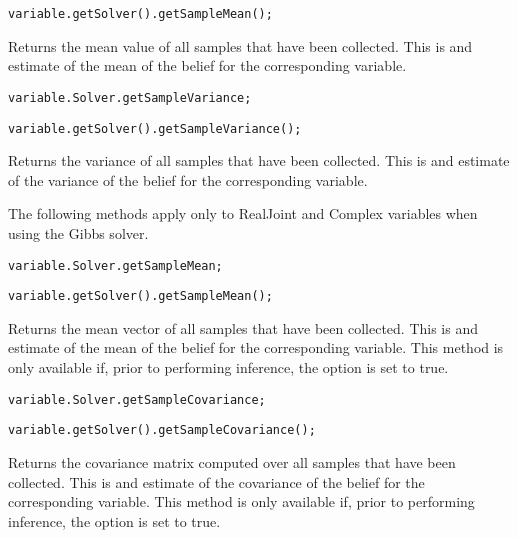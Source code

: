\ifjava
\begin{lstlisting}
variable.getSolver().getSampleMean();
\end{lstlisting}
\fi

Returns the mean value of all samples that have been collected.  This is and estimate of the mean of the belief for the corresponding variable.

\ifmatlab
\begin{lstlisting}
variable.Solver.getSampleVariance;
\end{lstlisting}
\fi

\ifjava
\begin{lstlisting}
variable.getSolver().getSampleVariance();
\end{lstlisting}
\fi

Returns the variance of all samples that have been collected.  This is and estimate of the variance of the belief for the corresponding variable.

\label{sec:RealJointVariableSpecificMethods}

The following methods apply only to RealJoint and Complex variables when using the Gibbs solver.

\ifmatlab
\begin{lstlisting}
variable.Solver.getSampleMean;
\end{lstlisting}
\fi

\ifjava
\begin{lstlisting}
variable.getSolver().getSampleMean();
\end{lstlisting}
\fi

Returns the mean vector of all samples that have been collected.  This is and estimate of the mean of the belief for the corresponding variable.  This method is only available if, prior to performing inference, the option   is set to true.

\ifmatlab
\begin{lstlisting}
variable.Solver.getSampleCovariance;
\end{lstlisting}
\fi

\ifjava
\begin{lstlisting}
variable.getSolver().getSampleCovariance();
\end{lstlisting}
\fi

Returns the covariance matrix computed over all samples that have been collected.  This is and estimate of the covariance of the belief for the corresponding variable.  This method is only available if, prior to performing inference, the option   is set to true.

